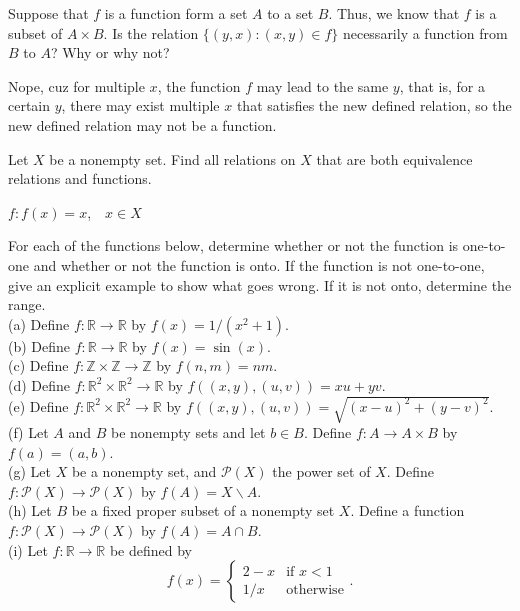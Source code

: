 \documentclass[11pt, a4paper, UTF8]{ctexart}
\begin{document}
\begin{problem}[UD: 13.11]
  Suppose that $f$ is a function form a set $A$ to a set $B$. Thus, we know that $f$ 
  is a subset of $A \times B$. Is the relation $\{(y,x):(x,y) \in f\}$ necessarily a 
  function from $B$ to $A$? Why or why not?
\end{problem}

\begin{solution}
  Nope, cuz for multiple $x$, the function $f$ may lead to the same $y$, that is, 
  for a certain $y$, there may exist multiple $x$ that satisfies the new defined relation, 
  so the new defined relation may not be a function.
\end{solution}

\begin{problem}[UD: 13.13]
  Let $X$ be a nonempty set. Find all relations on $X$ that are both equivalence 
  relations and functions.
\end{problem}

\begin{solution}
  $f:f(x)=x$,~~$x \in X$
\end{solution}

\begin{problem}[UD: 14.8]
  For each of the functions below, determine whether or not the function is one-to-one 
  and whether or not the function is onto. If the function is not one-to-one, give an 
  explicit example to show what goes wrong. If it is not onto, determine the range.\\
  (a) Define $f:\mathbb{R} \rightarrow \mathbb{R}$ by $f(x) = 1/(x^{2} + 1)$.\\
  (b) Define $f:\mathbb{R} \rightarrow \mathbb{R}$ by $f(x) = \sin{(x)}$.\\
  (c) Define $f:\mathbb{Z} \times \mathbb{Z} \rightarrow \mathbb{Z}$ by $f(n,m) = nm$.\\
  (d) Define $f:\mathbb{R}^{2} \times \mathbb{R}^{2} \rightarrow \mathbb{R}$ by 
  $f((x,y),(u,v)) = xu + yv$.\\
  (e) Define $f:\mathbb{R}^{2} \times \mathbb{R}^{2} \rightarrow \mathbb{R}$ by 
  $f((x,y),(u,v)) = \sqrt{(x - u)^{2} + (y - v)^{2}}$.\\
  (f) Let $A$ and $B$ be nonempty sets and let $b \in B$. Define $f:A \rightarrow A \times B$ 
  by $f(a) = (a,b)$.\\
  (g) Let $X$ be a nonempty set, and $\mathcal{P}(X)$ the power set of $X$. Define 
  $f:\mathcal{P}(X) \rightarrow \mathcal{P}(X)$ by $f(A) = X \backslash A$.\\
  (h) Let $B$ be a fixed proper subset of a nonempty set $X$. Define a function 
  $f:\mathcal{P}(X) \rightarrow \mathcal{P}(X)$ by $f(A) = A \cap B$.\\
  (i) Let $f:\mathbb{R} \rightarrow \mathbb{R}$ be defined by
  $$f(x) = 
    \begin{cases}
      2 - x& \text{if $x < 1$}\\
      1/x& \text{otherwise}
    \end{cases}.$$
\end{problem}
\end{document}
